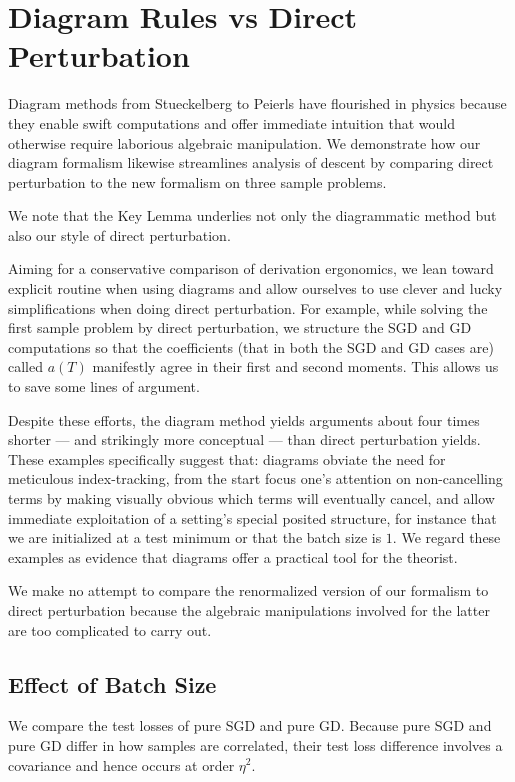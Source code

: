 \documentclass{article}
\begin{document}
\section{Diagram Rules vs Direct Perturbation} \label{sect:compare}
    Diagram methods from Stueckelberg to Peierls have flourished in physics
    because they enable swift computations and offer immediate intuition that
    would otherwise require laborious algebraic manipulation.  We demonstrate
    how our diagram formalism likewise streamlines analysis of descent by
    comparing direct perturbation to the new formalism on three sample
    problems.

    We note that the Key Lemma underlies not only the diagrammatic method but
    also our style of direct perturbation.

    Aiming for a conservative comparison of derivation ergonomics, we lean
    toward explicit routine when using diagrams and allow ourselves to use
    clever and lucky simplifications when doing direct perturbation.  For
    example, while solving the first sample problem by direct perturbation,
    we structure the SGD and GD computations so that the coefficients (that in
    both the SGD and GD cases are) called $a(T)$ manifestly agree in their
    first and second moments.  This allows us to save some lines of argument.

    Despite these efforts, the diagram method yields arguments about four times
    shorter --- and strikingly more conceptual --- than direct perturbation
    yields.  These examples specifically suggest that: diagrams obviate the
    need for meticulous index-tracking, from the start focus one's attention on
    non-cancelling terms by making visually obvious which terms will eventually
    cancel, and allow immediate exploitation of a setting's special posited
    structure, for instance that we are initialized at a test minimum or that
    the batch size is $1$.  We regard these examples as evidence that diagrams
    offer a practical tool for the theorist.

    We make no attempt to compare the renormalized version of our formalism
    to direct perturbation because the algebraic manipulations involved for
    the latter are too complicated to carry out.  

    \subsection{Effect of Batch Size}
        We compare the test losses of pure SGD and pure GD.  Because pure
        SGD and pure GD differ in how samples are correlated, their test loss
        difference involves a covariance and hence occurs at order $\eta^2$.  
\end{document}
